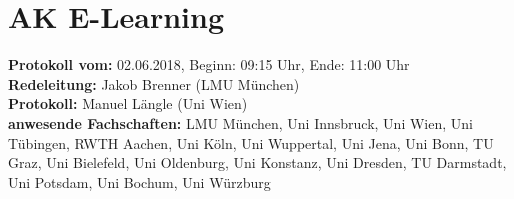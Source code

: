 
\section{AK E-Learning}

\textbf{Protokoll vom:} 02.06.2018,
Beginn: 09:15 Uhr,
Ende: 11:00 Uhr \\
\textbf{Redeleitung:} Jakob Brenner (LMU M\"unchen) \\
\textbf{Protokoll:} Manuel Längle (Uni Wien) \\
\textbf{anwesende Fachschaften:} LMU München, Uni Innsbruck, Uni Wien, Uni Tübingen, RWTH Aachen, Uni Köln, Uni Wuppertal, Uni Jena, Uni Bonn, TU Graz, Uni Bielefeld, Uni Oldenburg, Uni Konstanz, Uni Dresden, TU Darmstadt, Uni Potsdam, Uni Bochum, Uni Würzburg


